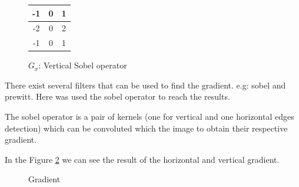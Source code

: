 \documentclass{article}
\begin{document}
\begin{figure}
  \begin{center}
  \begin{tabular}{ | c | c | c | }
    \hline
    -1 & 0 & 1 \\ \hline
    -2 & 0 & 2 \\ \hline
    -1 & 0 & 1 \\
    \hline
  \end{tabular}
  \end{center}
  \caption{$G_x$: Vertical Sobel operator\label{tab:sobelx}}
\end{figure}


There exist several filters that can be used to find the gradient. e.g: sobel and prewitt. Here was used the sobel operator to reach the results.

The sobel operator is a pair of kernels (one for vertical and one horizontal edges detection) which can be convoluted which the image to obtain their respective gradient.

In the Figure \ref{fig:gradient} we can see the result of the horizontal and vertical gradient.

	\begin{figure}[H]
	\centering
	\caption{Gradient}
	\label{fig:gradient}
	\end{figure}
\end{document}
